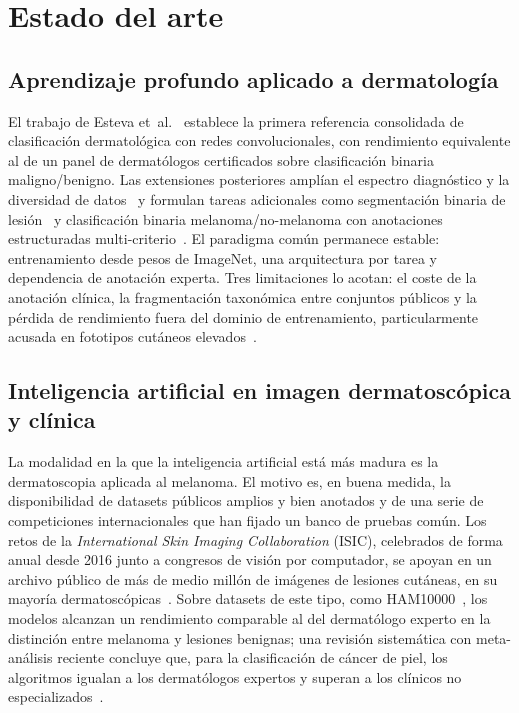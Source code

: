 
\chapter{Estado del arte}
\label{cap:sota}

\section{Aprendizaje profundo aplicado a dermatología}
\label{sec:dl-dermatologia}

El trabajo de Esteva et~al.~\cite{esteva2017} establece la primera
referencia consolidada de clasificación dermatológica con redes
convolucionales, con rendimiento equivalente al de un panel de
dermatólogos certificados sobre clasificación binaria
maligno/benigno. Las extensiones posteriores amplían el espectro
diagnóstico y la diversidad de datos~\cite{tschandl2018,ham10000} y
formulan tareas adicionales como segmentación binaria de
lesión~\cite{isic2018} y clasificación binaria
melanoma/no-melanoma con anotaciones estructuradas
multi-criterio~\cite{kawahara2019}. El paradigma común permanece
estable: entrenamiento desde pesos de ImageNet, una arquitectura por
tarea y dependencia de anotación experta. Tres limitaciones lo
acotan: el coste de la anotación clínica, la fragmentación
taxonómica entre conjuntos públicos y la pérdida de rendimiento
fuera del dominio de entrenamiento, particularmente acusada en
fototipos cutáneos elevados~\cite{fitzpatrick17k,ddi}.

\section{Inteligencia artificial en imagen dermatoscópica y clínica}
\label{sec:sota-modalidades}

La modalidad en la que la inteligencia artificial está más madura es
la dermatoscopia aplicada al melanoma. El motivo es, en buena medida,
la disponibilidad de datasets públicos amplios y bien anotados y de
una serie de competiciones internacionales que han fijado un banco de
pruebas común. Los retos de la \emph{International Skin Imaging
Collaboration} (ISIC), celebrados de forma anual desde 2016 junto a
congresos de visión por computador, se apoyan en un archivo público
de más de medio millón de imágenes de lesiones cutáneas, en su
mayoría dermatoscópicas~\cite{isicchallenge}. Sobre datasets de este tipo,
como HAM10000~\cite{ham10000}, los modelos alcanzan un rendimiento
comparable al del dermatólogo experto en la distinción entre melanoma
y lesiones benignas; una revisión sistemática con meta-análisis
reciente concluye que, para la clasificación de cáncer de piel, los
algoritmos igualan a los dermatólogos expertos y superan a los
clínicos no especializados~\cite{salinas2024}.

